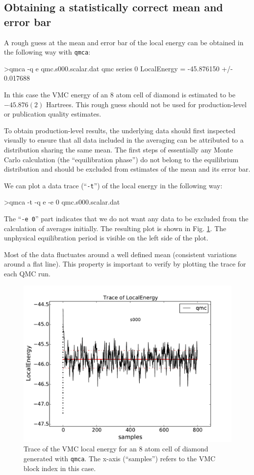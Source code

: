 \subsection{Obtaining a statistically correct mean and error bar}
\label{sec:qmca_mean_error}
A rough guess at the mean and error bar of the local energy can be 
obtained in the following way with \texttt{qmca}:
\begin{shade}
>qmca -q e qmc.s000.scalar.dat 
qmc  series 0  LocalEnergy           =  -45.876150 +/- 0.017688 
\end{shade}
\noindent
In this case the VMC energy of an 8 atom cell of diamond is estimated 
to be $-45.876(2)$ Hartrees.  This rough guess should not be used 
for production-level or publication quality estimates.

To obtain production-level results, the underlying data should first  
inspected visually to ensure that all data included in the averaging 
can be attributed to a distribution sharing the same mean.  The first 
steps of essentially any Monte Carlo calculation (the ``equilibration 
phase'') do not belong to the equilibrium distribution and should be 
excluded from estimates of the mean and its error bar.

We can plot a data trace (``\texttt{-t}'') of the local energy in the 
following way:
\begin{shade}
>qmca -t -q e -e 0 qmc.s000.scalar.dat
\end{shade}
\noindent
The ``\texttt{-e 0}'' part indicates that we do not want any data 
to be excluded from the calculation of averages initially.  The resulting 
plot is shown in Fig. \ref{fig:qmca_mean_error_trace}.  The unphysical 
equilibration period is visible on the left side of the plot.

Most of the data fluctuates around a well defined mean (consistent 
variations around a flat line).  This property is important to verify  
by plotting the trace for each QMC run. 

\begin{figure}
\begin{center}
\includegraphics[trim = 0mm 0mm 0mm 0mm, clip,width=0.75\columnwidth]{figures/qmca_mean_error_trace.pdf}
\end{center}
\caption{Trace of the VMC local energy for an 8 atom cell of diamond generated with \texttt{qmca}.  The x-axis (``samples'') refers to the VMC block index in this case.
\label{fig:qmca_mean_error_trace}
}
\end{figure}

